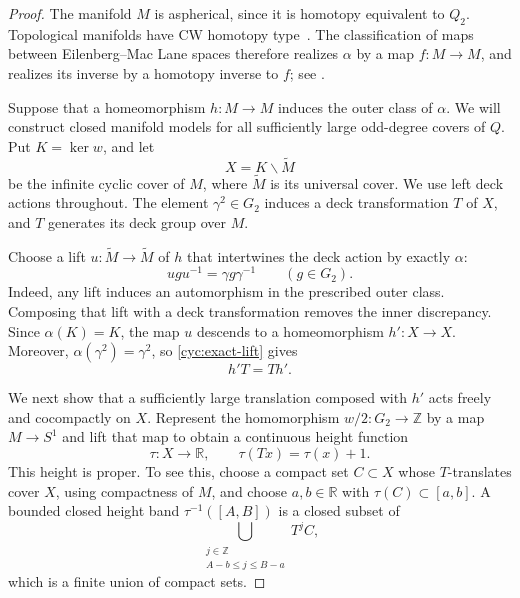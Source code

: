 \begin{proof}
The manifold $M$ is aspherical, since it is homotopy equivalent to
$Q_2$.  Topological manifolds have CW homotopy type~\cite{Milnor1959}.
The classification
of maps between Eilenberg--Mac Lane spaces therefore realizes $\alpha$
by a map $f\colon M\to M$, and realizes its inverse by a homotopy
inverse to $f$; see \cite[Proposition~1B.9]{Hatcher2002}.

Suppose that a homeomorphism $h\colon M\to M$ induces the outer class
of $\alpha$.  We will construct closed manifold models for all
sufficiently large odd-degree covers of $Q$.
Put $K=\ker w$, and let
\[
 X=K\backslash\widetilde M
\]
be the infinite cyclic cover of $M$, where $\widetilde M$ is its
universal cover.  We use left deck actions throughout.  The element
$\gamma^2\in G_2$ induces a deck transformation $T$ of $X$, and $T$
generates its deck group over $M$.

Choose a lift $u\colon\widetilde M\to\widetilde M$ of $h$ that
intertwines the deck action by exactly $\alpha$:
\begin{equation}\label{cyc:exact-lift}
 u g u^{-1}=\gamma g\gamma^{-1}
 \qquad(g\in G_2).
\end{equation}
Indeed, any lift induces an automorphism in the prescribed outer
class.  Composing that lift with a deck transformation removes the
inner discrepancy.  Since $\alpha(K)=K$, the map $u$ descends to a
homeomorphism $h'\colon X\to X$.  Moreover,
$\alpha(\gamma^2)=\gamma^2$, so \eqref{cyc:exact-lift} gives
\begin{equation}\label{cyc:commutation}
 h'T=Th'.
\end{equation}

We next show that a sufficiently large translation composed with $h'$
acts freely and cocompactly on $X$.  Represent the homomorphism
$w/2\colon G_2\to\mathbb Z$ by a map $M\to S^1$ and lift that map
to obtain a continuous height function
\[
 \tau\colon X\longrightarrow\mathbb R,
 \qquad \tau(Tx)=\tau(x)+1.
\]
This height is proper.  To see this, choose a compact set $C\subset X$
whose $T$-translates cover $X$, using compactness of $M$, and choose
$a,b\in\mathbb R$ with $\tau(C)\subset[a,b]$.  A bounded closed
height band $\tau^{-1}([A,B])$ is a closed subset of
\[
 \bigcup_{\substack{j\in\mathbb Z\\ A-b\leq j\leq B-a}}T^jC,
\]
which is a finite union of compact sets.


\end{proof}
